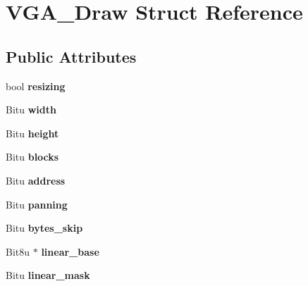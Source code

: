 \hypertarget{structVGA__Draw}{\section{V\-G\-A\-\_\-\-Draw Struct Reference}
\label{structVGA__Draw}
}
\subsection*{Public Attributes}
\begin{DoxyCompactItemize}
\item 
\hypertarget{structVGA__Draw_a381501871266cfba1c72decba4a2f7c7}{bool {\bfseries resizing}}\label{structVGA__Draw_a381501871266cfba1c72decba4a2f7c7}

\item 
\hypertarget{structVGA__Draw_a36a82d8c915ad24c39eae9153ef2dcda}{Bitu {\bfseries width}}\label{structVGA__Draw_a36a82d8c915ad24c39eae9153ef2dcda}

\item 
\hypertarget{structVGA__Draw_a5411400a75d154cd1e19ad1b59ac2b1a}{Bitu {\bfseries height}}\label{structVGA__Draw_a5411400a75d154cd1e19ad1b59ac2b1a}

\item 
\hypertarget{structVGA__Draw_a501bdf42aa08ffb4692f4d2ca595d3f4}{Bitu {\bfseries blocks}}\label{structVGA__Draw_a501bdf42aa08ffb4692f4d2ca595d3f4}

\item 
\hypertarget{structVGA__Draw_ad40a98ea7bc7584db6cf70d0e476e923}{Bitu {\bfseries address}}\label{structVGA__Draw_ad40a98ea7bc7584db6cf70d0e476e923}

\item 
\hypertarget{structVGA__Draw_a45fdfaa1b6c42c7e8ed6f8077e0a1c6f}{Bitu {\bfseries panning}}\label{structVGA__Draw_a45fdfaa1b6c42c7e8ed6f8077e0a1c6f}

\item 
\hypertarget{structVGA__Draw_a4930b20b3cdbcf4d8dc08cbc33108521}{Bitu {\bfseries bytes\-\_\-skip}}\label{structVGA__Draw_a4930b20b3cdbcf4d8dc08cbc33108521}

\item 
\hypertarget{structVGA__Draw_aa4f9d17b90451c4ca08fb86ddf004208}{Bit8u $\ast$ {\bfseries linear\-\_\-base}}\label{structVGA__Draw_aa4f9d17b90451c4ca08fb86ddf004208}

\item 
\hypertarget{structVGA__Draw_a6b4f0288166c814bbc70e794f641f507}{Bitu {\bfseries linear\-\_\-mask}}\label{structVGA__Draw_a6b4f0288166c814bbc70e794f641f507}


\end{DoxyCompactItemize}
